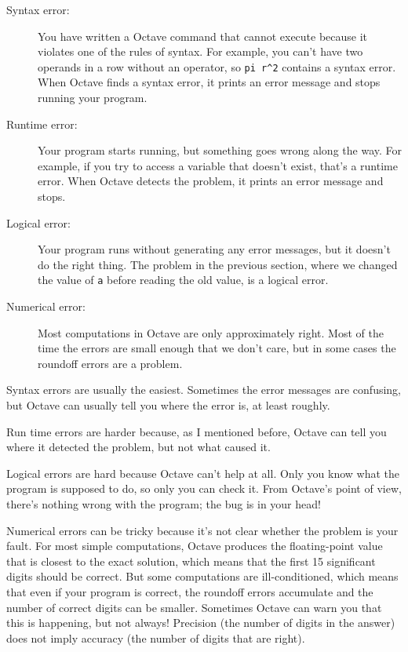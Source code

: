 \documentclass{book}
\begin{document}
\begin{description}

\item[Syntax error:] You have written a Octave command that cannot
execute because it violates one of the rules of syntax. For example,
you can't have two operands in a row without an operator, so 
\verb+pi r^2+ contains a syntax error. When Octave finds a syntax
error, it prints an error message and stops running your program.

\item[Runtime error:] Your program starts running, but something goes
wrong along the way. For example, if you try to access a variable
that doesn't exist, that's a runtime error. When Octave detects the
problem, it prints an error message and stops.

\item[Logical error:] Your program runs without generating any error
messages, but it doesn't do the right thing. The problem in the
previous section, where we changed the value of {\tt a} before
reading the old value, is a logical error.

\item[Numerical error:] Most computations in Octave are only
approximately right. Most of the time the errors are small enough
that we don't care, but in some cases the roundoff errors are a problem.

\end{description}

Syntax errors are usually the easiest. Sometimes the error messages
are confusing, but Octave can usually tell you where the error is, at
least roughly.

Run time errors are harder because, as I mentioned before, Octave
can tell you where it detected the problem, but not what caused it.

Logical errors are hard because Octave can't help at all. Only you
know what the program is supposed to do, so only you can check it.
From Octave's point of view, there's nothing wrong with the program;
the bug is in your head!

Numerical errors can be tricky because it's not clear whether the
problem is your fault. For most simple computations, Octave produces
the floating-point value that is closest to the exact solution, which
means that the first 15 significant digits should be correct. But some
computations are ill-conditioned, which means that even if your program
is correct, the roundoff errors accumulate and the number of correct
digits can be smaller. Sometimes Octave can warn you that
this is happening, but not always! Precision (the number of digits
in the answer) does not imply accuracy (the number of digits that
are right).
\end{document}
